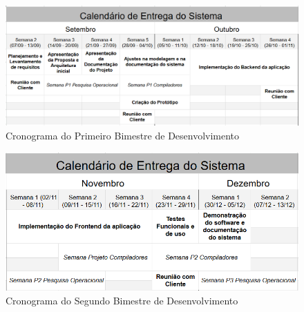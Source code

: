 \documentclass[12pt,a4paper]{report}
\begin{document}
\vspace{2cm}

\begin{figure}[!h]
\centering
\includegraphics[width = \linewidth]{imagens/Calendario1bi.png}
\caption{Cronograma do Primeiro Bimestre de Desenvolvimento}
\label{Cronograma do Primeiro Bimestre de Desenvolvimento}
\end{figure}

\begin{figure}[!h]
\centering
\includegraphics[width = \linewidth]{imagens/Calendario2bi.png}
\caption{Cronograma do Segundo Bimestre de Desenvolvimento}
\label{Cronograma do Segundo Bimestre de Desenvolvimento}
\end{figure}
\end{document}
